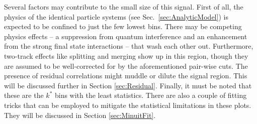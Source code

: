 Several factors may contribute to the small size of this signal.  First of all, the physics of the identical particle systems (see Sec.\ \ref{sec:AnalyticModel}) is expected to be confined to just the few lowest bins.  There may be competing physics effects -- a suppression from quantum interference and an enhancement from the strong final state interactions -- that wash each other out.  Furthermore, two-track effects like splitting and merging show up in this region, though they are assumed to be well-corrected for by the aforementioned pair-wise cuts.  The presence of residual correlations might muddle or dilute the signal region.  This will be discussed further in Section \ref{sec:Residual}.  Finally, it must be noted that these are the $k^*$ bins with the least statistics.  There are also a couple of fitting tricks that can be employed to mitigate the statistical limitations in these plots.  They will be discussed in Section \ref{sec:MinuitFit}.






